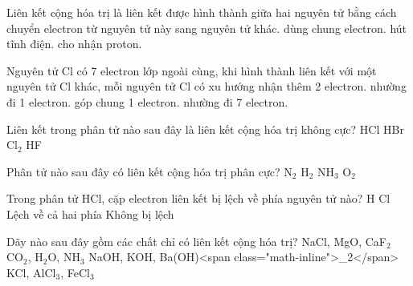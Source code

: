 \begin{ex}
Liên kết cộng hóa trị là liên kết được hình thành giữa hai nguyên tử bằng cách
\choice
{chuyển electron từ nguyên tử này sang nguyên tử khác.}
{\True dùng chung electron.}
{hút tĩnh điện.}
{cho nhận proton.}
\end{ex}

\begin{ex}
Nguyên tử Cl có 7 electron lớp ngoài cùng, khi hình thành liên kết với một nguyên tử Cl khác, mỗi nguyên tử Cl có xu hướng
\choice
{nhận thêm 2 electron.}
{nhường đi 1 electron.}
{\True góp chung 1 electron.}
{nhường đi 7 electron.}
\end{ex}

\begin{ex}
Liên kết trong phân tử nào sau đây là liên kết cộng hóa trị không cực?
\choice
{HCl}
{HBr}
{\True Cl$_2$}
{HF}
\end{ex}

\begin{ex}
Phân tử nào sau đây có liên kết cộng hóa trị phân cực?
\choice
{N$_2$}
{H$_2$}
{\True NH$_3$}
{O$_2$}
\end{ex}

\begin{ex}
Trong phân tử HCl, cặp electron liên kết bị lệch về phía nguyên tử nào?
\choice
{H}
{\True Cl}
{Lệch về cả hai phía}
{Không bị lệch}
\end{ex}

\begin{ex}
Dãy nào sau đây gồm các chất chỉ có liên kết cộng hóa trị?
\choice
{NaCl, MgO, CaF$_2$}
{\True CO$_2$, H$_2$O, NH$_3$}
{NaOH, KOH, Ba(OH)<span class="math-inline">\_2</span>}
{KCl, AlCl$_3$, FeCl$_3$}
\end{ex}


